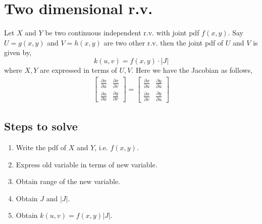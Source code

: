 \documentclass[oneside,11pt,pdftex]{book}%
\numberwithin{equation}{section}
\numberwithin{section}{chapter}
\numberwithin{equation}{chapter}
\begin{document}
\section{Two dimensional r.v.}
Let $ X $ and $ Y $ be two continuous independent r.v. with joint pdf $ f(x,y) $. Say $ U=g(x,y) $ and $ V=h(x,y) $ are two other r.v. then the joint pdf of $ U $ and $ V $ is given by,
\[ k(u,v)=f(x,y)\cdot |J| \]
where $ X, Y$ are expressed in terms of $ U,V $.
Here we have the Jacobian as follows,
\begin{align*}
	\begin{bmatrix}
	\frac{\partial x }{\partial u} & \frac{\partial x}{\partial v}\\[1ex]
	\frac{\partial u}{\partial u} & \frac{\partial y}{\partial v}
\end{bmatrix}=	\begin{bmatrix}
		\frac{\partial x }{\partial u} & \frac{\partial y}{\partial u}\\[1ex]
		\frac{\partial x}{\partial v} & \frac{\partial y}{\partial u}
	\end{bmatrix}
\end{align*}
\subsection{Steps to solve}
\begin{enumerate}
	\item Write the pdf of $ X $ and $ Y $, i.e. $ f(x,y) $.
	\item Express old variable in terms of new variable.
	\item Obtain range of the new variable.
	\item Obtain $ J $ and $ |J| $.
	\item Obtain $ k(u,v)=f(x,y)|J| $.
\end{enumerate}
\end{document}
